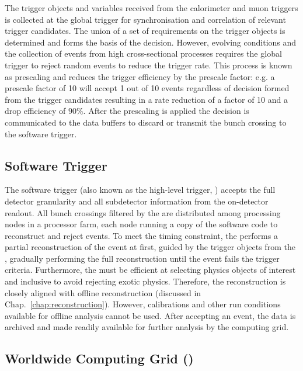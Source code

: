 The trigger objects and variables received from the calorimeter and muon
triggers is collected at the global trigger for synchronisation and
correlation of relevant trigger candidates. The union of a set of requirements
on the trigger objects is determined and forms the basis of the \HWT decision.
However, evolving conditions and the collection of events from high
cross-sectional processes requires the global trigger to reject random events
to reduce the trigger rate. This process is known as prescaling and reduces
the trigger efficiency by the prescale factor: e.g. a prescale factor of 10
will accept 1 out of 10 events regardless of decision formed from the trigger
candidates resulting in a rate reduction of a factor of 10 and a drop
efficiency of $90\%$. After the prescaling is applied the \HWT decision is
communicated to the data buffers to discard or transmit the bunch crossing to
the software trigger.


\subsection{Software Trigger}\label{sec:software-trigger}

The software trigger (also known as the high-level trigger, \SWT) accepts the
full detector granularity and all subdetector information from the on-detector
readout. All bunch crossings filtered by the \HWT are distributed among
processing nodes in a processor farm, each node running a copy of the software
code to reconstruct and reject events. To meet the timing constraint, the \SWT
performs a partial reconstruction of the event at first, guided by the trigger
objects from the \HWT, gradually performing the full reconstruction until the
event fails the trigger criteria. Furthermore, the \SWT must be efficient at
selecting physics objects of interest and inclusive to avoid rejecting exotic
physics. Therefore, the \SWT reconstruction is closely aligned with offline
reconstruction (discussed in Chap.~\ref{chap:reconstruction}). However,
calibrations and other run conditions available for offline analysis cannot be
used. After accepting an event, the data is archived and made readily available
for further analysis by the computing grid.


\subsection{Worldwide \LHC Computing Grid (\WLCG)}


